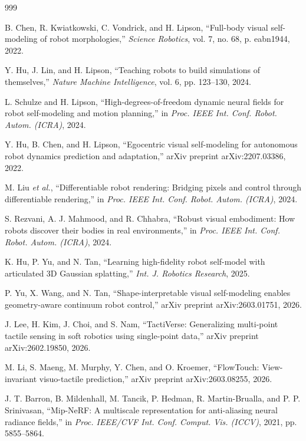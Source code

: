 ﻿\documentclass[11pt,a4paper]{article}
\begin{document}
\begin{thebibliography}{999}

B. Chen, R. Kwiatkowski, C. Vondrick, and H. Lipson, ``Full-body visual self-modeling of robot morphologies,'' \textit{Science Robotics}, vol. 7, no. 68, p. eabn1944, 2022.

Y. Hu, J. Lin, and H. Lipson, ``Teaching robots to build simulations of themselves,'' \textit{Nature Machine Intelligence}, vol. 6, pp. 123--130, 2024.

L. Schulze and H. Lipson, ``High-degrees-of-freedom dynamic neural fields for robot self-modeling and motion planning,'' in \textit{Proc. IEEE Int. Conf. Robot. Autom. (ICRA)}, 2024.

Y. Hu, B. Chen, and H. Lipson, ``Egocentric visual self-modeling for autonomous robot dynamics prediction and adaptation,'' arXiv preprint arXiv:2207.03386, 2022.

M. Liu \textit{et al.}, ``Differentiable robot rendering: Bridging pixels and control through differentiable rendering,'' in \textit{Proc. IEEE Int. Conf. Robot. Autom. (ICRA)}, 2024.

S. Rezvani, A. J. Mahmood, and R. Chhabra, ``Robust visual embodiment: How robots discover their bodies in real environments,'' in \textit{Proc. IEEE Int. Conf. Robot. Autom. (ICRA)}, 2024.

K. Hu, P. Yu, and N. Tan, ``Learning high-fidelity robot self-model with articulated {3D} Gaussian splatting,'' \textit{Int. J. Robotics Research}, 2025.

P. Yu, X. Wang, and N. Tan, ``Shape-interpretable visual self-modeling enables geometry-aware continuum robot control,'' arXiv preprint arXiv:2603.01751, 2026.

J. Lee, H. Kim, J. Choi, and S. Nam, ``{TactiVerse}: Generalizing multi-point tactile sensing in soft robotics using single-point data,'' arXiv preprint arXiv:2602.19850, 2026.

M. Li, S. Maeng, M. Murphy, Y. Chen, and O. Kroemer, ``{FlowTouch}: View-invariant visuo-tactile prediction,'' arXiv preprint arXiv:2603.08255, 2026.

J. T. Barron, B. Mildenhall, M. Tancik, P. Hedman, R. Martin-Brualla, and P. P. Srinivasan, ``{Mip-NeRF}: A multiscale representation for anti-aliasing neural radiance fields,'' in \textit{Proc. IEEE/CVF Int. Conf. Comput. Vis. (ICCV)}, 2021, pp. 5855--5864.


\end{thebibliography}
\end{document}
